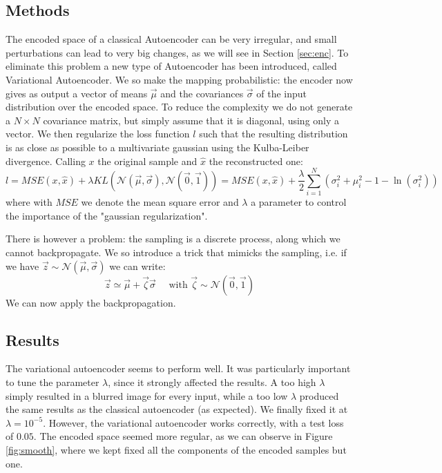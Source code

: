 \subsection{Methods}
The encoded space of a classical Autoencoder can be very irregular, and small perturbations can lead to very big changes, as we will see in Section \ref{sec:enc}.
To eliminate this problem a new type of Autoencoder has been introduced, called Variational Autoencoder. We so make the mapping probabilistic: the encoder now gives as output a
vector of means $\vec{\mu}$ and the covariances $\vec{\sigma}$ of the input distribution over the encoded space. 
To reduce the complexity we do not generate a $N\times N$ covariance matrix, but simply assume that it is diagonal, using only a vector.
We then regularize the loss function $l$ such that the resulting distribution is 
as close as possible to a multivariate gaussian using the Kulba-Leiber divergence. Calling $x$ the original sample and $\hat{x}$ the reconstructed one:
$$
l = MSE(x, \hat{x})+\lambda KL(\mathcal{N}(\vec{\mu}, \vec{\sigma}), \mathcal{N}(\vec{0}, \vec{1})) = 
MSE(x, \hat{x}) +\frac{\lambda}{2}\sum_{i=1}^N \left( \sigma_i^2+\mu_i^2-1-\ln(\sigma_i^2) \right)
$$
where with $MSE$ we denote the mean square error and $\lambda$ a parameter to control the importance of the "gaussian regularization". 

There is however a problem: the sampling is a discrete process, along which we cannot backpropagate. We so introduce a trick that 
mimicks the sampling, i.e. if we have $\vec{z}\sim \mathcal{N}(\vec{\mu}, \vec{\sigma})$ we can write:
\begin{equation}
    \vec{z} \simeq \vec{\mu} + \vec{\zeta} \vec{\sigma} \quad \mbox{ with } \vec{\zeta} \sim \mathcal{N}(\vec{0}, \vec{1})
\end{equation}
We can now apply the backpropagation.

\subsection{Results}
The variational autoencoder seems to perform well. It was particularly important to tune the parameter $\lambda$, since it strongly affected
the results. A too high $\lambda$ simply resulted in a blurred image for every input, while a too low $\lambda$ produced the same results as the 
classical autoencoder (as expected). We finally fixed it at $\lambda=10^{-5}$.
However, the variational autoencoder works correctly, with a test loss of $0.05$. The encoded space seemed more regular, as we can observe in Figure
\ref{fig:smooth}, where we kept fixed all the components of the encoded samples but one.

